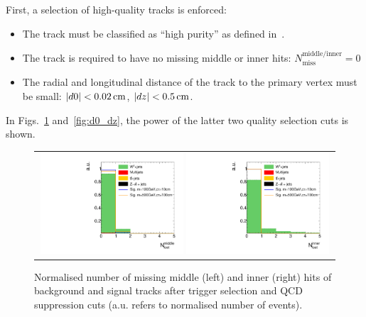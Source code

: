 First, a selection of high-quality tracks is enforced:
\begin{itemize}
\renewcommand{\labelitemi}{\footnotesize{\ding{118}}}
\item The track must be classified as ``high purity'' as defined in~\cite{bib:CMS:Tracking_2010}.
\item The track is required to have no missing middle or inner hits: $N_{\text{miss}}^{\text{middle/inner}}=0$
\item The radial and longitudinal  distance of the track to the primary vertex must be small: \mbox{$|d0|<0.02\,\text{cm}$}, \mbox{$|dz|<0.5\,\text{cm}$}.
\end{itemize}
In Figs.~\ref{fig:LostHits} and~\ref{fig:d0_dz}, the power of the latter two quality selection cuts is shown.
\begin{figure}[!h]
  \centering 
\vspace{20pt}
  \begin{tabular}{c}
    \includegraphics[width=0.49\textwidth]{figures/analysis_2/AnalysisSelection/chiTracksQCDsupressionTrigger_2Signals_FullBkg/htrackNLostMid_lin.pdf}
    \includegraphics[width=0.49\textwidth]{figures/analysis_2/AnalysisSelection/chiTracksQCDsupressionTrigger_2Signals_FullBkg/htrackNLostInner_lin.pdf}
  \end{tabular}
  \caption{Normalised number of missing middle (left) and inner (right) hits of background and signal tracks after trigger selection and QCD suppression cuts (a.u. refers to normalised number of events).}
  \label{fig:LostHits}
\end{figure}
